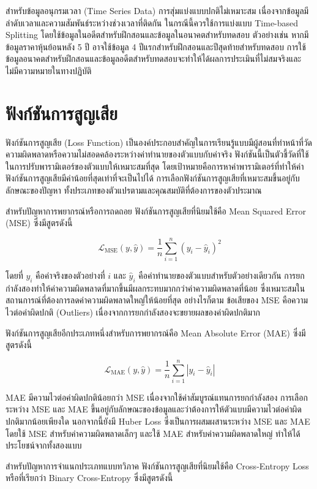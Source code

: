 สำหรับข้อมูลอนุกรมเวลา (Time Series Data) การสุ่มแบ่งแบบปกติไม่เหมาะสม เนื่องจากข้อมูลมีลำดับเวลาและความสัมพันธ์ระหว่างช่วงเวลาที่ติดกัน ในกรณีนี้ควรใช้การแบ่งแบบ Time-based Splitting โดยใช้ข้อมูลในอดีตสำหรับฝึกสอนและข้อมูลในอนาคตสำหรับทดสอบ ตัวอย่างเช่น หากมีข้อมูลราคาหุ้นย้อนหลัง 5 ปี อาจใช้ข้อมูล 4 ปีแรกสำหรับฝึกสอนและปีสุดท้ายสำหรับทดสอบ การใช้ข้อมูลอนาคตสำหรับฝึกสอนและข้อมูลอดีตสำหรับทดสอบจะทำให้ได้ผลการประเมินที่ไม่สมจริงและไม่มีความหมายในทางปฏิบัติ

\section{ฟังก์ชันการสูญเสีย}
ฟังก์ชันการสูญเสีย (Loss Function) เป็นองค์ประกอบสำคัญในการเรียนรู้แบบมีผู้สอนที่ทำหน้าที่วัดความผิดพลาดหรือความไม่สอดคล้องระหว่างค่าทำนายของตัวแบบกับค่าจริง ฟังก์ชันนี้เป็นตัวชี้วัดที่ใช้ในการปรับพารามิเตอร์ของตัวแบบให้เหมาะสมที่สุด โดยเป้าหมายคือการหาค่าพารามิเตอร์ที่ทำให้ค่าฟังก์ชันการสูญเสียมีค่าน้อยที่สุดเท่าที่จะเป็นไปได้ การเลือกฟังก์ชันการสูญเสียที่เหมาะสมขึ้นอยู่กับลักษณะของปัญหา ทั้งประเภทของตัวแปรตามและคุณสมบัติที่ต้องการของตัวประมาณ

สำหรับปัญหาการพยากรณ์หรือการถดถอย ฟังก์ชันการสูญเสียที่นิยมใช้คือ Mean Squared Error (MSE) ซึ่งมีสูตรดังนี้

\[
\mathcal{L}_{\text{MSE}}(y, \hat{y}) = \frac{1}{n}\sum_{i=1}^{n}(y_i - \hat{y}_i)^{2}
\]

โดยที่ $y_i$ คือค่าจริงของตัวอย่างที่ $i$ และ $\hat{y}_i$ คือค่าทำนายของตัวแบบสำหรับตัวอย่างเดียวกัน การยกกำลังสองทำให้ค่าความผิดพลาดที่มากขึ้นมีผลกระทบมากกว่าค่าความผิดพลาดที่น้อย ซึ่งเหมาะสมในสถานการณ์ที่ต้องการลดค่าความผิดพลาดใหญ่ให้น้อยที่สุด อย่างไรก็ตาม ข้อเสียของ MSE คือความไวต่อค่าผิดปกติ (Outliers) เนื่องจากการยกกำลังสองจะขยายผลของค่าผิดปกติมาก

ฟังก์ชันการสูญเสียอีกประเภทหนึ่งสำหรับการพยากรณ์คือ Mean Absolute Error (MAE) ซึ่งมีสูตรดังนี้

\[
\mathcal{L}_{\text{MAE}}(y, \hat{y}) = \frac{1}{n}\sum_{i=1}^{n}|y_i - \hat{y}_i|
\]

MAE มีความไวต่อค่าผิดปกติน้อยกว่า MSE เนื่องจากใช้ค่าสัมบูรณ์แทนการยกกำลังสอง การเลือกระหว่าง MSE และ MAE ขึ้นอยู่กับลักษณะของข้อมูลและว่าต้องการให้ตัวแบบมีความไวต่อค่าผิดปกติมากน้อยเพียงใด นอกจากนี้ยังมี Huber Loss ซึ่งเป็นการผสมผสานระหว่าง MSE และ MAE โดยใช้ MSE สำหรับค่าความผิดพลาดเล็กๆ และใช้ MAE สำหรับค่าความผิดพลาดใหญ่ ทำให้ได้ประโยชน์จากทั้งสองแบบ

สำหรับปัญหาการจำแนกประเภทแบบทวิภาค ฟังก์ชันการสูญเสียที่นิยมใช้คือ Cross-Entropy Loss หรือที่เรียกว่า Binary Cross-Entropy ซึ่งมีสูตรดังนี้

